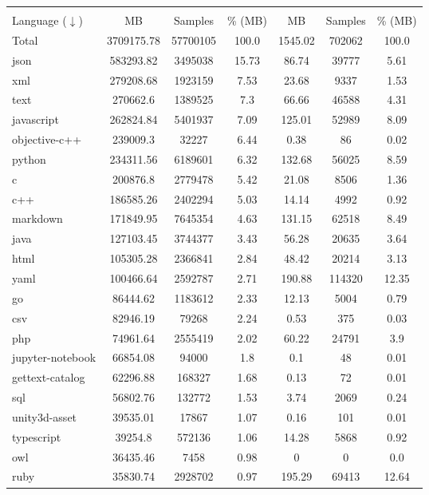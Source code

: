 \begin{longtable}{l|ccc|ccc}   
    \toprule
 & \multicolumn{3}{c|}{\data{}} & \multicolumn{3}{c}{\dataft{}} \\
Language ($\downarrow$) & MB & Samples & \% (MB) & MB & Samples & \% (MB) \\
\midrule
Total & 3709175.78 & 57700105 & 100.0 & 1545.02 & 702062 & 100.0 \\
\midrule
json & 583293.82 & 3495038 & 15.73 & 86.74 & 39777 & 5.61 \\
xml & 279208.68 & 1923159 & 7.53 & 23.68 & 9337 & 1.53 \\
text & 270662.6 & 1389525 & 7.3 & 66.66 & 46588 & 4.31 \\
javascript & 262824.84 & 5401937 & 7.09 & 125.01 & 52989 & 8.09 \\
objective-c++ & 239009.3 & 32227 & 6.44 & 0.38 & 86 & 0.02 \\
python & 234311.56 & 6189601 & 6.32 & 132.68 & 56025 & 8.59 \\
c & 200876.8 & 2779478 & 5.42 & 21.08 & 8506 & 1.36 \\
c++ & 186585.26 & 2402294 & 5.03 & 14.14 & 4992 & 0.92 \\
markdown & 171849.95 & 7645354 & 4.63 & 131.15 & 62518 & 8.49 \\
java & 127103.45 & 3744377 & 3.43 & 56.28 & 20635 & 3.64 \\
html & 105305.28 & 2366841 & 2.84 & 48.42 & 20214 & 3.13 \\
yaml & 100466.64 & 2592787 & 2.71 & 190.88 & 114320 & 12.35 \\
go & 86444.62 & 1183612 & 2.33 & 12.13 & 5004 & 0.79 \\
csv & 82946.19 & 79268 & 2.24 & 0.53 & 375 & 0.03 \\
php & 74961.64 & 2555419 & 2.02 & 60.22 & 24791 & 3.9 \\
jupyter-notebook & 66854.08 & 94000 & 1.8 & 0.1 & 48 & 0.01 \\
gettext-catalog & 62296.88 & 168327 & 1.68 & 0.13 & 72 & 0.01 \\
sql & 56802.76 & 132772 & 1.53 & 3.74 & 2069 & 0.24 \\
unity3d-asset & 39535.01 & 17867 & 1.07 & 0.16 & 101 & 0.01 \\
typescript & 39254.8 & 572136 & 1.06 & 14.28 & 5868 & 0.92 \\
owl & 36435.46 & 7458 & 0.98 & 0 & 0 & 0.0 \\
ruby & 35830.74 & 2928702 & 0.97 & 195.29 & 69413 & 12.64 \\

\end{longtable}
